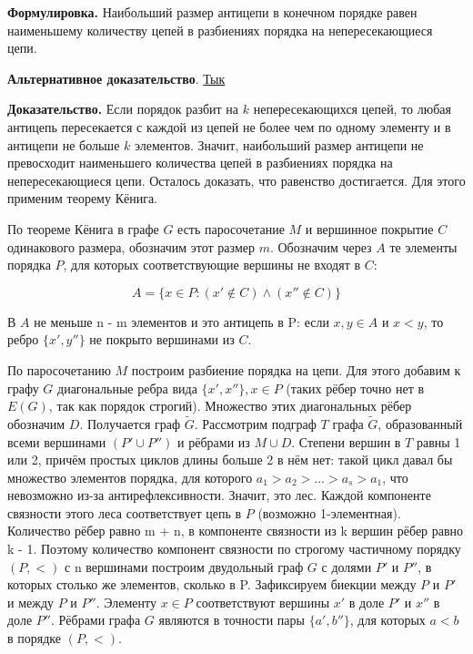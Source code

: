\documentclass[a4paper, 10pt]{article}
\begin{document}
\textbf{Формулировка.} Наибольший размер антицепи в конечном порядке равен наименьшему количеству цепей в разбиениях порядка на непересекающиеся цепи.

\medskip

\textbf{Альтернативное доказательство}. \href{https://youtu.be/hU1f8-HAqSI?t=2679}{Тык} \footnotemark[1]{}


\medskip

\textbf{Доказательство.} Если порядок разбит на $k$ непересекающихся цепей, то любая антицепь пересекается с каждой из цепей не более чем по одному элементу и в антицепи не больше $k$ элементов. Значит, наибольший размер антицепи не превосходит наименьшего количества цепей в разбиениях порядка на непересекающиеся цепи. Осталось доказать, что равенство достигается. Для этого применим теорему Кёнига.

\medskip

\begin{center}
    \drWalley[15][yellow]
\end{center}




По теореме Кёнига в графе $G$ есть паросочетание $M$ и вершинное покрытие $C$ одинакового размера, обозначим этот размер $m$. Обозначим через $A$ те элементы порядка $P$, для которых соответствующие вершины не входят в $C$:

$$A = \{x \in P \colon (x'\notin C) \wedge (x'' \notin C)\}$$

В $A$ не меньше n - m элементов и это антицепь в P: если $x, y \in A$ и $x < y$, то ребро $\{x', y''\}$ не покрыто вершинами из $C$.

По паросочетанию $M$ построим разбиение порядка на цепи. Для этого добавим к графу $G$ диагональные ребра вида $\{x', x''\}, x \in P$ (таких рёбер точно нет в $E(G)$, так как порядок строгий). Множество этих диагональных рёбер обозначим $D$. Получается граф $\tilde{G}$. Рассмотрим подграф $T$ графа $\tilde{G}$, образованный всеми вершинами $(P' \cup P'')$ и рёбрами из $M \cup D$. Степени вершин в $T$ равны 1 или 2, причём простых циклов длины больше 2 в нём нет: такой цикл давал бы множество элементов порядка, для которого $a_1 > a_2 > \dots > a_s > a_1$, что невозможно из-за антирефлексивности. Значит, это лес. Каждой компоненте связности этого леса соответствует цепь в $P$ (возможно 1-элементная). Количество рёбер равно m + n, в компоненте связности из k вершин рёбер равно k - 1. Поэтому количество компонент связности по строгому частичному порядку $(P, <)$ с n вершинами построим двудольный граф $G$ с долями $P'$ и $P''$, в которых столько же элементов, сколько в P. Зафиксируем биекции между $P$ и $P'$ и между $P$ и $P''$. Элементу $x \in P$ соответствуют вершины $x'$ в доле $P'$ и $x''$ в доле $P''$. Рёбрами графа $G$ являются в точности пары $\{a', b''\}$, для которых $a < b$ в порядке $(P, <)$.
\end{document}
